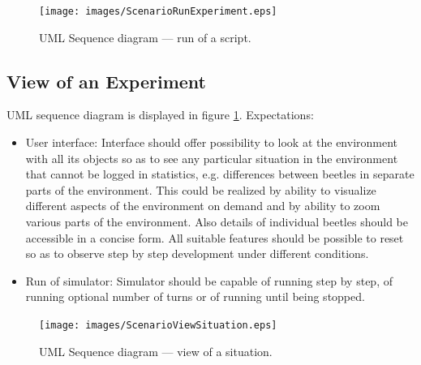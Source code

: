 \documentclass[a4paper,12pt]{report}
\begin{document}
\begin{figure}
\begin{center}
  \texttt{[image: images/ScenarioRunExperiment.eps]} 
  \caption{UML Sequence diagram --- run of a script.}
  \label{obr.ScenarioRunExperiment}
\end{center}
\end{figure}

\subsection{View of an Experiment}
UML sequence diagram is displayed in figure \ref{obr.ScenarioRunExperiment}. Expectations:
\begin{itemize}
\item User interface: Interface should offer possibility to look at the environment with all its objects so as to see any particular situation in the environment that cannot be logged in statistics, e.g. differences between beetles in separate parts of the environment. This could be realized by ability to visualize different aspects of the environment on demand and by ability to zoom various parts of the environment. Also details of individual beetles should be accessible in a concise form. All suitable features should be possible to reset so as to observe step by step development under different conditions. 
\item Run of simulator: Simulator should be capable of running step by step, of running optional number of turns or of running until being stopped.
\end{itemize}

\begin{figure}
\begin{center}
  \texttt{[image: images/ScenarioViewSituation.eps]} 
  \caption{UML Sequence diagram --- view of a situation.}
  \label{obr.ScenarioViewSituation}
\end{center}
\end{figure}
\end{document}
